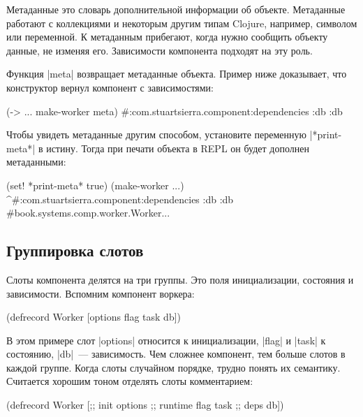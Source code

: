 Метаданные это словарь дополнительной информации об объекте. Метаданные работают
с коллекциями и некоторым другим типам Clojure, например, символом или
переменной. К метаданным прибегают, когда нужно сообщить объекту данные, не
изменяя его. Зависимости компонента подходят на эту роль.

Функция \spverb|meta| возвращает метаданные объекта. Пример ниже доказывает, что
конструктор вернул компонент с зависимостями:

\begin{english}
  \begin{clojure}
(-> {...} make-worker meta)
#:com.stuartsierra.component{:dependencies {:db :db}}
  \end{clojure}
\end{english}

Чтобы увидеть метаданные другим способом, установите переменную
\spverb|*print-meta*| в истину. Тогда при печати объекта в REPL он будет
дополнен метаданными:

\begin{english}
  \begin{clojure}
(set! *print-meta* true)
(make-worker {...})
^#:com.stuartsierra.component{:dependencies {:db :db}}
#book.systems.comp.worker.Worker{...}
  \end{clojure}
\end{english}

\subsection{Группировка слотов}

Слоты компонента делятся на три группы. Это поля инициализации, состояния и
зависимости. Вспомним компонент воркера:

\begin{english}
  \begin{clojure}
(defrecord Worker
    [options flag task db])
  \end{clojure}
\end{english}

В этом примере слот \spverb|options| относится к инициализации, \spverb|flag| и
\spverb|task| к состоянию, \spverb|db|~--- зависимость. Чем сложнее компонент,
тем больше слотов в каждой группе. Когда слоты случайном порядке, трудно понять
их семантику. Считается хорошим тоном отделять слоты комментарием:

\begin{english}
  \begin{clojure}
(defrecord Worker
    [;; init
     options
     ;; runtime
     flag
     task
     ;; deps
     db])
  \end{clojure}
\end{english}

